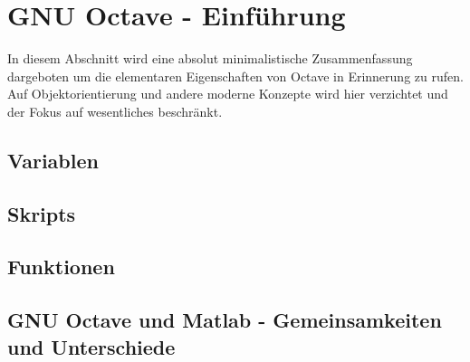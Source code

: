\section{GNU Octave - Einführung}
In diesem Abschnitt wird eine absolut minimalistische Zusammenfassung
dargeboten um die elementaren Eigenschaften von Octave in Erinnerung zu
rufen. Auf Objektorientierung und andere moderne Konzepte wird hier
verzichtet und der Fokus auf wesentliches beschränkt.

\subsection{Variablen}

\subsection{Skripts}

\subsection{Funktionen}

\subsection{GNU Octave und Matlab - Gemeinsamkeiten und Unterschiede}
